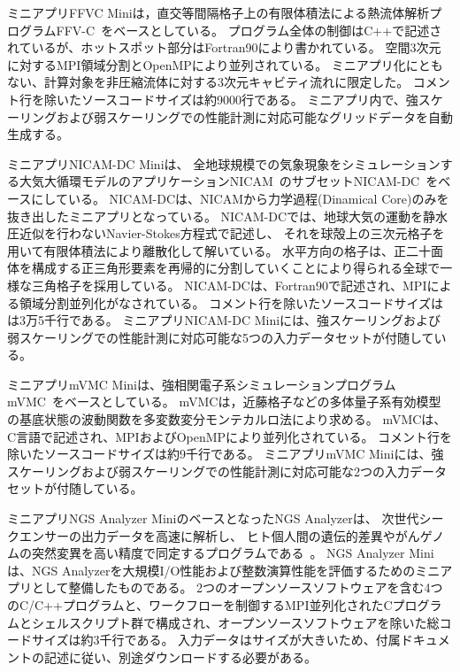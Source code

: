 ミニアプリFFVC Miniは，直交等間隔格子上の有限体積法による熱流体解析プログラムFFV-C~\cite{FFVC_ono2014}をベースとしている。
プログラム全体の制御はC++で記述されているが、ホットスポット部分はFortran90により書かれている。
空間3次元に対するMPI領域分割とOpenMPにより並列されている。
ミニアプリ化にともない、計算対象を非圧縮流体に対する3次元キャビティ流れに限定した。
コメント行を除いたソースコードサイズは約9000行である。
ミニアプリ内で、強スケーリングおよび弱スケーリングでの性能計測に対応可能なグリッドデータを自動生成する。

ミニアプリNICAM-DC Miniは、
全地球規模での気象現象をシミュレーションする大気大循環モデルのアプリケーションNICAM~\cite{NICAM_satoh2008}のサブセットNICAM-DC~\cite{NICAM-DC_url}をベースにしている。
NICAM-DCは、NICAMから力学過程(Dinamical Core)のみを抜き出したミニアプリとなっている。
NICAM-DCでは、地球大気の運動を静水圧近似を行わないNavier-Stokes方程式で記述し、
それを球殻上の三次元格子を用いて有限体積法により離散化して解いている。
水平方向の格子は、正二十面体を構成する正三角形要素を再帰的に分割していくことにより得られる全球で一様な三角格子を採用している。
NICAM-DCは、Fortran90で記述され、MPIによる領域分割並列化がなされている。
コメント行を除いたソースコードサイズはは3万5千行である。
ミニアプリNICAM-DC Miniには、強スケーリングおよび弱スケーリングでの性能計測に対応可能な5つの入力データセットが付随している。

ミニアプリmVMC Miniは、強相関電子系シミュレーションプログラムmVMC~\cite{mVMC_url,mVMC_tahara2008}をベースとしている。
mVMCは，近藤格子などの多体量子系有効模型の基底状態の波動関数を多変数変分モンテカルロ法により求める。
mVMCは、C言語で記述され、MPIおよびOpenMPにより並列化されている。
コメント行を除いたソースコードサイズは約9千行である。
ミニアプリmVMC Miniには、強スケーリングおよび弱スケーリングでの性能計測に対応可能な2つの入力データセットが付随している。

ミニアプリNGS Analyzer MiniのベースとなったNGS Analyzerは、
次世代シークエンサーの出力データを高速に解析し、
ヒト個人間の遺伝的差異やがんゲノムの突然変異を高い精度で同定するプログラムである~\cite{NGSA_url}。
NGS Analyzer Miniは、NGS Analyzerを大規模I/O性能および整数演算性能を評価するためのミニアプリとして整備したものである。
2つのオープンソースソフトウェアを含む4つのC/C++プログラムと、ワークフローを制御するMPI並列化されたCプログラムとシェルスクリプト群で構成され、オープンソースソフトウェアを除いた総コードサイズは約3千行である。
入力データはサイズが大きいため、付属ドキュメントの記述に従い、別途ダウンロードする必要がある。


